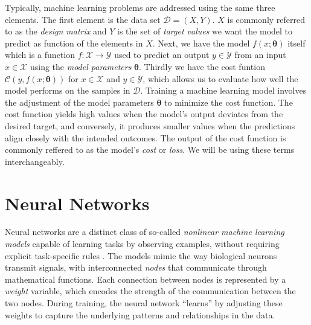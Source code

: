 \documentclass[a4paper, UKenglish, 11pt]{uiomaster}
\begin{document}
Typically, machine learning problems are addressed using the same three elements.
The first element is the data set $\mathcal{D} = (X, Y)$. $X$ is commonly referred to as the \emph{design matrix} and $Y$ is the set of \emph{target values} we want the model to predict as function of the elements in $X$.
Next, we have the model $f(x; \boldsymbol{\theta})$ itself which is a function $f : \mathcal{X} \to \mathcal{Y}$ used to predict an output $y \in \mathcal{Y}$ from an input $x \in \mathcal{X}$ using the \emph{model parameters} $\boldsymbol{\theta}$.
Thirdly we have the cost funtion $\mathcal{C}(y, f(x; \boldsymbol{\theta}))$ for $x \in \mathcal{X}$ and $y \in \mathcal{Y}$, which allows us to evaluate how well the model performs on the samples in $\mathcal{D}$. Training a machine learning model involves the adjustment of the model parameters $\boldsymbol{\theta}$ to minimize the cost function. The cost function yields high values when the model's output deviates from the desired target, and conversely, it produces smaller values when the predictions align closely with the intended outcomes. The output of the cost function is commonly reffered to as the model's \emph{cost} or \emph{loss}. We will be using these terms interchangeably.





\section{Neural Networks}

Neural networks are a distinct class of so-called \emph{nonlinear machine learning models} capable of learning tasks by observing examples, without requiring explicit task-specific rules \cite{Hjorth-Jensen2022}. The models mimic the way biological neurons transmit signals, with interconnected \emph{nodes} that communicate through mathematical functions. Each connection between nodes is represented by a \emph{weight} variable, which encodes the strength of the communication between the two nodes. During training, the neural network ``learns'' by adjusting these weights to capture the underlying patterns and relationships in the data.
\end{document}
